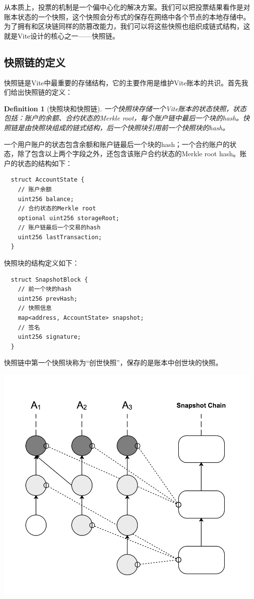 \documentclass[UTF8,nofonts]{ctexart}
\newtheorem{definition}{Definition}[section]
\begin{document}
\begin{multicols}{2}
从本质上，投票的机制是一个偏中心化的解决方案。我们可以把投票结果看作是对账本状态的一个快照，这个快照会分布式的保存在网络中各个节点的本地存储中。为了拥有和区块链同样的防篡改能力，我们可以将这些快照也组织成链式结构，这就是Vite设计的核心之一——快照链\cite{snapshotchain}。

\subsection{快照链的定义}
快照链是Vite中最重要的存储结构，它的主要作用是维护Vite账本的共识。首先我们给出快照链的定义：
\begin{definition}[快照块和快照链]
一个快照块存储一个Vite账本的状态快照，状态包括：账户的余额、合约状态的Merkle root，每个账户链中最后一个块的hash。快照链是由快照块组成的链式结构，后一个快照块引用前一个快照块的hash。
\end{definition}

一个用户账户的状态包含余额和账户链最后一个块的hash；一个合约账户的状态，除了包含以上两个字段之外，还包含该账户合约状态的Merkle root hash。账户的状态的结构如下：

\begin{verbatim}
  struct AccountState {
    // 账户余额
    uint256 balance;
    // 合约状态的Merkle root
    optional uint256 storageRoot;
    // 账户链最后一个交易的hash
    uint256 lastTransaction;
  }
\end{verbatim}

快照块的结构定义如下：
\begin{verbatim}
  struct SnapshotBlock {
    // 前一个块的hash    
    uint256 prevHash;
    // 快照信息
    map<address, AccountState> snapshot;
    // 签名
    uint256 signature;
  }
\end{verbatim}

快照链中第一个快照块称为“创世快照”，保存的是账本中创世块的快照。

\includegraphics[width=.8\linewidth]{image/snapshotchain.png}


\end{multicols}
\end{document}
